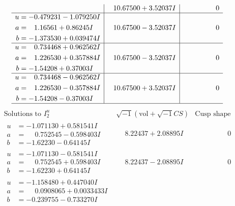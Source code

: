 \documentclass[1p]{elsarticle_modified}
\theoremstyle{definition}
\newcommand{\I}{\sqrt{-1}}
\begin{document}
$$\begin{array}{c|c|c}
 & \phantom{-}10.67500 + 3.52037 I & \phantom{-0.000000 } 0 \\ \hline\begin{aligned}
u &= -0.479231 - 1.079250 I \\
a &= \phantom{-}1.16561 + 0.86245 I \\
b &= -1.373530 + 0.039474 I\end{aligned}
 & \phantom{-}10.67500 - 3.52037 I & \phantom{-0.000000 } 0 \\ \hline\begin{aligned}
u &= \phantom{-}0.734468 + 0.962562 I \\
a &= \phantom{-}1.226530 + 0.357884 I \\
b &= -1.54208 + 0.37003 I\end{aligned}
 & \phantom{-}10.67500 - 3.52037 I & \phantom{-0.000000 } 0 \\ \hline\begin{aligned}
u &= \phantom{-}0.734468 - 0.962562 I \\
a &= \phantom{-}1.226530 - 0.357884 I \\
b &= -1.54208 - 0.37003 I\end{aligned}
 & \phantom{-}10.67500 + 3.52037 I & \phantom{-0.000000 } 0\\
 \hline 
 \end{array}$$\newpage$$\begin{array}{c|c|c}  
\text{Solutions to }I^u_{2}& \I (\text{vol} + \sqrt{-1}CS) & \text{Cusp shape}\\
 \hline 
\begin{aligned}
u &= -1.071130 + 0.581541 I \\
a &= \phantom{-}0.752545 - 0.598403 I \\
b &= -1.62230 - 0.64145 I\end{aligned}
 & \phantom{-}8.22437 + 2.08895 I & \phantom{-0.000000 } 0 \\ \hline\begin{aligned}
u &= -1.071130 - 0.581541 I \\
a &= \phantom{-}0.752545 + 0.598403 I \\
b &= -1.62230 + 0.64145 I\end{aligned}
 & \phantom{-}8.22437 - 2.08895 I & \phantom{-0.000000 } 0 \\ \hline\begin{aligned}
u &= -1.158480 + 0.447040 I \\
a &= \phantom{-}0.0908065 + 0.0033433 I \\
b &= -0.239755 - 0.733270 I\end{aligned}

\end{array}$$
\end{document}
